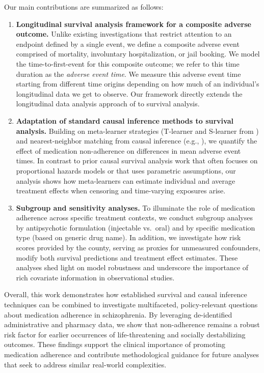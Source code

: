 Our main contributions are summarized as follows:
\begin{enumerate}\setlength{\itemsep}{0pt}
    \item \textbf{Longitudinal survival analysis framework for a composite adverse outcome.}
    Unlike existing investigations that restrict attention to an endpoint defined by a single event, we define a composite adverse event comprised of mortality, involuntary hospitalization, or jail booking.
We model the time-to-first-event for this composite outcome; we refer to this time duration as the \emph{adverse event time}.
We measure this adverse event time starting from different time origins depending on how much of an individual's longitudinal data we get to observe.
Our framework directly extends the longitudinal data analysis approach of \citet{fitzmaurice2009longitudinal} to survival analysis.
    \item \textbf{Adaptation of standard causal inference methods to survival analysis.}
    Building on meta-learner strategies (T-learner and S-learner from \citet{kunzel2019metalearners}) and nearest-neighbor matching from causal inference (e.g., \citet{stuart2010matching}), we quantify the effect of medication non-adherence on differences in mean adverse event times.
    In contrast to prior causal survival analysis work that often focuses on proportional hazards models or that uses parametric assumptions, our analysis shows how meta-learners can estimate individual and average treatment effects when censoring and time-varying exposures arise.

    \item \textbf{Subgroup and sensitivity analyses.}
    To illuminate the role of medication adherence across specific treatment contexts, we conduct subgroup analyses by antipsychotic formulation (injectable vs.\ oral) and by specific medication type (based on generic drug name).
    In addition, we investigate how risk scores provided by the county, serving as proxies for unmeasured confounders, modify both survival predictions and treatment effect estimates.
    These analyses shed light on model robustness and underscore the importance of rich covariate information in observational studies.
\end{enumerate}
Overall, this work demonstrates how established survival and causal inference techniques can be combined to investigate multifaceted, policy-relevant questions about medication adherence in schizophrenia.
By leveraging de-identified administrative and pharmacy data, we show that non-adherence remains a robust risk factor for earlier occurrences of life-threatening and socially destabilizing outcomes.
These findings support the clinical importance of promoting medication adherence and contribute methodological guidance for future analyses that seek to address similar real-world complexities.

